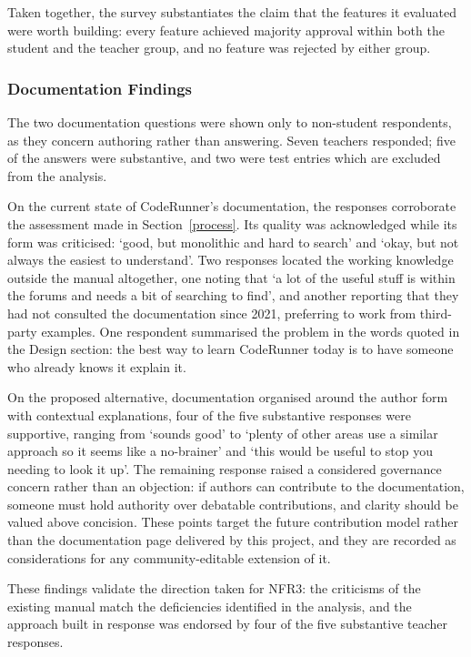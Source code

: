 Taken together, the survey substantiates the claim that the features it evaluated were worth building: every feature achieved majority approval within both the student and the teacher group, and no feature was rejected by either group.

\subsubsection{Documentation Findings}

The two documentation questions were shown only to non-student respondents, as they concern authoring rather than answering. Seven teachers responded; five of the answers were substantive, and two were test entries which are excluded from the analysis.

On the current state of CodeRunner's documentation, the responses corroborate the assessment made in Section~\ref{process}. Its quality was acknowledged while its form was criticised: `good, but monolithic and hard to search' and `okay, but not always the easiest to understand'. Two responses located the working knowledge outside the manual altogether, one noting that `a lot of the useful stuff is within the forums and needs a bit of searching to find', and another reporting that they had not consulted the documentation since 2021, preferring to work from third-party examples. One respondent summarised the problem in the words quoted in the Design section: the best way to learn CodeRunner today is to have someone who already knows it explain it.

On the proposed alternative, documentation organised around the author form with contextual explanations, four of the five substantive responses were supportive, ranging from `sounds good' to `plenty of other areas use a similar approach so it seems like a no-brainer' and `this would be useful to stop you needing to look it up'. The remaining response raised a considered governance concern rather than an objection: if authors can contribute to the documentation, someone must hold authority over debatable contributions, and clarity should be valued above concision. These points target the future contribution model rather than the documentation page delivered by this project, and they are recorded as considerations for any community-editable extension of it.

These findings validate the direction taken for NFR3: the criticisms of the existing manual match the deficiencies identified in the analysis, and the approach built in response was endorsed by four of the five substantive teacher responses.

